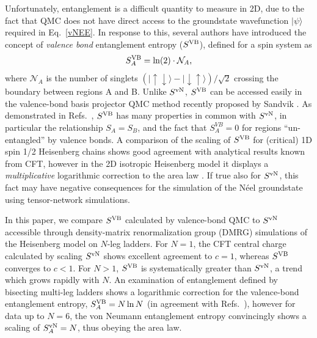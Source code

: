 \documentclass[prl,aps,twocolumn,floatfix,amsmath,amssymb,superscriptaddress,tightenlines]{revtex4}
\begin{document}
Unfortunately, entanglement is a difficult quantity to
measure in 2D, due to the fact that QMC 
does not have
direct access to the groundstate wavefunction $| \psi \rangle$ required
in Eq.~\eqref{vNEE}.  In response to this, several authors \cite{Alet,
Chh} have introduced the concept of {\it valence bond}
entanglement entropy ($S^{\rm VB}$), defined for a  spin system as
\begin{equation} 
S^{\rm VB}_A = \ln(2) \cdot \mathcal{N}_A, \label{VBEE}
\end{equation} 
where $ \mathcal{N}_A$ is the number of singlets
${( |\uparrow \downarrow \rangle - | \downarrow \uparrow
\rangle)/\sqrt{2}}$ crossing the boundary between regions A and B.  Unlike
$S^{ \rm vN}$, $S^{\rm VB}$ can be accessed easily in the valence-bond basis
projector QMC method recently proposed by Sandvik \cite{Sandvik}.  As
demonstrated in Refs.~\cite{Alet,Chh}, $S^{\rm VB}$ has many properties in
common with $S^{ \rm vN}$, in particular the relationship $S_A = S_B$, and the
fact that $S^{VB}_A=0$ for regions ``un-entangled'' by valence bonds.
A comparison of the scaling of $S^{\rm VB}$ for (critical) 1D spin
1/2 Heisenberg chains shows good agreement with analytical results known
from CFT, however in the
 2D isotropic Heisenberg model it
displays a {\it multiplicative} logarithmic correction to the area law \cite{Alet,Chh}.  If
true also for $S^{ \rm vN}$, this fact may have negative consequences for the simulation of the 
N\'eel groundstate using tensor-network simulations.

 
In this paper, we compare $S^{\rm VB}$ calculated by valence-bond QMC to 
$S^{ \rm vN}$ accessible through density-matrix renormalization group
(DMRG) simulations of the Heisenberg model on $N$-leg ladders.    For $N=1$, the CFT central charge calculated  by scaling
$S^{ \rm vN}$ shows excellent agreement to $c=1$, whereas $S^{\rm VB}$ converges
to $c<1$.
For $N>1$, $S^{\rm VB}$ is systematically greater than $S^{ \rm vN}$,
a trend which grows rapidly with $N$. An
examination of entanglement defined by bisecting multi-leg ladders
shows a logarithmic correction for the valence-bond entanglement entropy, $S^{\rm VB}_A = N \ln
N$ (in agreement with Refs.~\cite{Alet,Chh}), however for data up to
$N=6$, the von Neumann entanglement entropy  convincingly shows a scaling of
$S^{\rm vN}_A = N$, thus obeying the area law.
\end{document}
